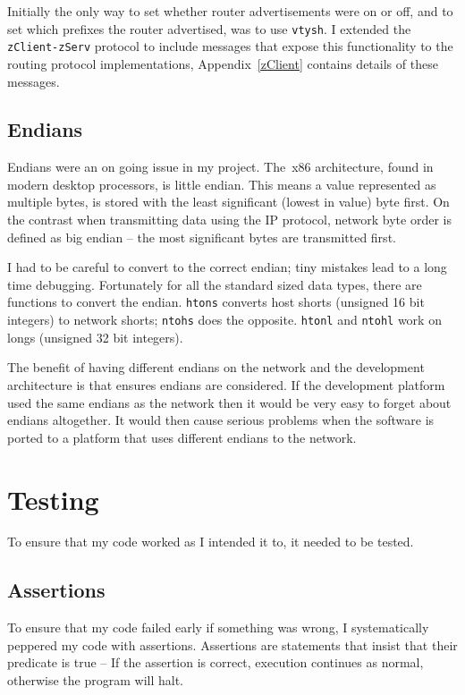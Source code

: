\documentclass[12pt,a4paper,twoside]{report}
\begin{document}
Initially the only way to set whether router advertisements were on or off, and
to set which prefixes the router advertised, was to use \texttt{vtysh}. I
extended the \texttt{zClient-zServ} protocol to include messages that expose
this functionality to the routing protocol implementations,
Appendix~\ref{zClient} contains details of these messages. 

\section{Endians}
Endians were an on going issue in my project. The\ x86 architecture, found in
modern desktop processors, is little endian.  This means a value represented as
multiple bytes, is stored with the least significant (lowest in value) byte
first. On the contrast when transmitting data using the IP protocol, network
byte order is defined as big endian -- the most significant bytes are
transmitted first. 

I had to be careful to convert to the correct endian; tiny mistakes lead
to a long time debugging. Fortunately for all the standard sized data types,
there are functions to convert the endian.  \texttt{htons} converts host shorts
(unsigned 16 bit integers) to network shorts; \texttt{ntohs} does the opposite.
\texttt{htonl} and \texttt{ntohl} work on longs (unsigned 32 bit integers). 

The benefit of having different endians on the network and the development
architecture is that ensures endians are considered. If the development platform
used the same endians as the network then it would be very easy to forget about
endians altogether. It would then cause serious problems when the software is
ported to a platform that uses different endians to the network.
    
\chapter{Testing}
To ensure that my code worked as I intended it to, it needed to be tested. 

\section{Assertions}
To ensure that my code failed early if something was wrong, I systematically
peppered my code with assertions. Assertions are statements that insist that
their predicate is true -- If the assertion is correct, execution continues as
normal, otherwise the program will halt.
\end{document}

